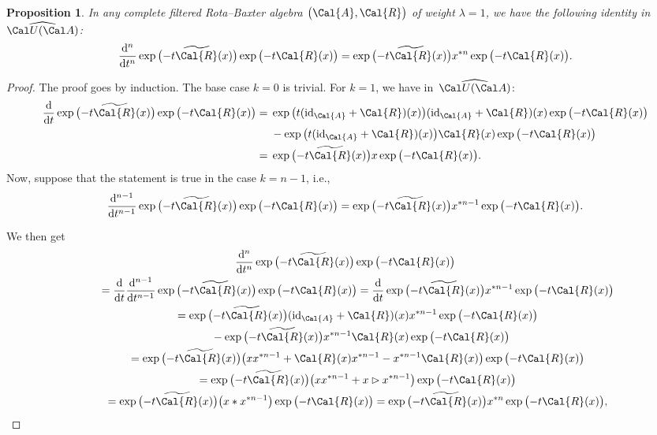 \documentclass[pdftex]{sigma}
\numberwithin{equation}{section}
\newtheorem{Proposition}[Theorem]{Proposition}
 { \theoremstyle{definition}
\newtheorem{Definition}[Theorem]{Definition}
\newtheorem{Note}[Theorem]{Note}
\newtheorem{Example}[Theorem]{Example}
\newtheorem{Remark}[Theorem]{Remark} }
\begin{document}
\begin{Proposition}
In any complete filtered Rota--Baxter algebra $\big(\Cal{A}, \Cal{R}\big)$ of weight $\lambda = 1$, we have the following identity in $\widehat{\Cal U(\Cal A)}$:
\begin{equation}
\label{diffeq1}
\frac{{\rm d}^n}{{\rm d}t^n} \exp\big({-}t \widetilde{\Cal{R}}(x)\big) \exp\big({-}t \Cal{R}(x)\big)
= \exp\big({-}t \widetilde{\Cal{R}}(x)\big) x^{\ast n} \exp\big({-}t \Cal{R}(x)\big).
\end{equation}
\end{Proposition}

\begin{proof}
The proof goes by induction. The base case $k=0$ is trivial. For $k=1$, we have in~$\widehat{\Cal U(\Cal A)}$:
\begin{align*}
\frac{\rm d}{{\rm d}t} \exp\big({-}t \widetilde{\Cal{R}}(x)\big) \exp\big({-}t \Cal{R}(x)\big)
= {}&\exp\big(t ({\rm id}_{\Cal{A}} + \Cal{R})(x)\big) ({\rm id}_{\Cal{A}} + \Cal{R})(x) \exp\big({-}t \Cal{R}(x)\big)
\\
&-\exp\big(t ({\rm id}_{\Cal{A}} + \Cal{R})(x)\big) \Cal{R}(x) \exp\big({-}t \Cal{R}(x)\big)
\\
={}& \exp\big({-}t \widetilde{\Cal{R}}(x)\big) x \exp\big({-}t \Cal{R}(x)\big).
\end{align*}
Now, suppose that the statement is true in the case $k=n-1$, i.e.,
\begin{equation*}
\frac{{\rm d}^{n-1}}{{\rm d}t^{n-1}} \exp\big({-}t \widetilde{\Cal{R}}(x)\big) \exp\big({-}t \Cal{R}(x)\big)
= \exp\big({-}t \widetilde{\Cal{R}}(x)\big) x^{\ast {n-1}} \exp\big({-}t \Cal{R}(x)\big).
\end{equation*}
{\samepage We then get
\begin{gather*}
\frac{{\rm d}^{n}}{{\rm d}t^{n}} \exp\big({-}t \widetilde{\Cal{R}}(x)\big) \exp\big({-}t \Cal{R}(x)\big)
\\ \qquad
{} = \frac{\rm d}{{\rm d}t} \frac{{\rm d}^{n-1}}{{\rm d}t^{n-1}} \exp\big({-}t \widetilde{\Cal{R}}(x)\big) \exp\big({-}t \Cal{R}(x)\big)
 = \frac{\rm d}{{\rm d}t} \exp\big({-}t \widetilde{\Cal{R}}(x)\big) x^{\ast {n-1}} \exp\big({-}t \Cal{R}(x)\big)
\\ \qquad
{}= \exp\big({-}t \widetilde{\Cal{R}}(x)\big) ({\rm id}_{\Cal{A}} + \Cal{R})(x) x^{\ast n-1}
\exp\big({-}t \Cal{R}(x)\big)
\\ \qquad\hphantom{=}
{} - \exp\big({-}t \widetilde{\Cal{R}}(x)\big) x^{\ast n-1}\Cal{R}(x) \exp\big({-}t \Cal{R}(x)\big)
\\ \qquad
{}= \exp\big({-}t \widetilde{\Cal{R}}(x)\big) \big(x x^{\ast n-1} + \Cal{R}(x) x^{\ast n-1} - x^{\ast n-1} \Cal{R}(x)\big) \exp\big({-}t \Cal{R}(x)\big)
\\ \qquad
{} = \exp\big({-}t \widetilde{\Cal{R}}(x)\big) \big(x x^{\ast n-1} + x \rhd x^{\ast n-1}\big) \exp\big({-}t \Cal{R}(x)\big)
\\ \qquad
{}= \exp\big({-}t \widetilde{\Cal{R}}(x)\big) \big( x \ast x^{\ast n-1}\big) \exp\big({-}t \Cal{R}(x)\big)
 = \exp\big({-}t \widetilde{\Cal{R}}(x)\big) x^{\ast {n}} \exp\big({-}t \Cal{R}(x)\big),
\end{gather*}

}
\end{proof}
\end{document}
